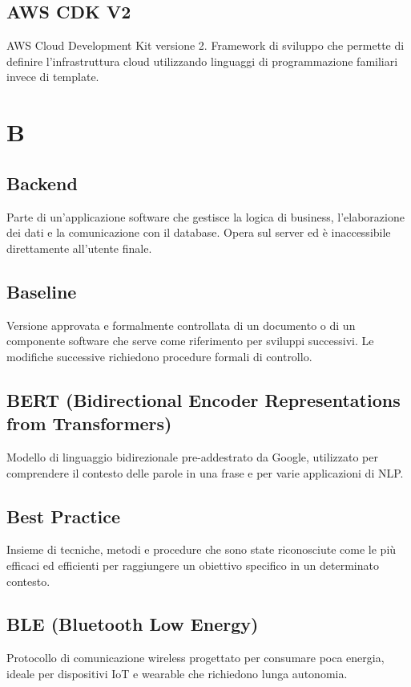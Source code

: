 \documentclass[a4paper,11pt]{article}
\begin{document}
\subsection{AWS CDK V2}
AWS Cloud Development Kit versione 2. Framework di sviluppo che permette di definire l'infrastruttura cloud utilizzando linguaggi di programmazione familiari invece di template.

\newpage
\section{B}

\subsection{Backend}
Parte di un'applicazione software che gestisce la logica di business, l'elaborazione dei dati e la comunicazione con il database. Opera sul server ed è inaccessibile direttamente all'utente finale.

\subsection{Baseline}
Versione approvata e formalmente controllata di un documento o di un componente software che serve come riferimento per sviluppi successivi. Le modifiche successive richiedono procedure formali di controllo.

\subsection{BERT (Bidirectional Encoder Representations from Transformers)}
Modello di linguaggio bidirezionale pre-addestrato da Google, utilizzato per comprendere il contesto delle parole in una frase e per varie applicazioni di NLP.

\subsection{Best Practice}
Insieme di tecniche, metodi e procedure che sono state riconosciute come le più efficaci ed efficienti per raggiungere un obiettivo specifico in un determinato contesto.

\subsection{BLE (Bluetooth Low Energy)}
Protocollo di comunicazione wireless progettato per consumare poca energia, ideale per dispositivi IoT e wearable che richiedono lunga autonomia.
\end{document}

